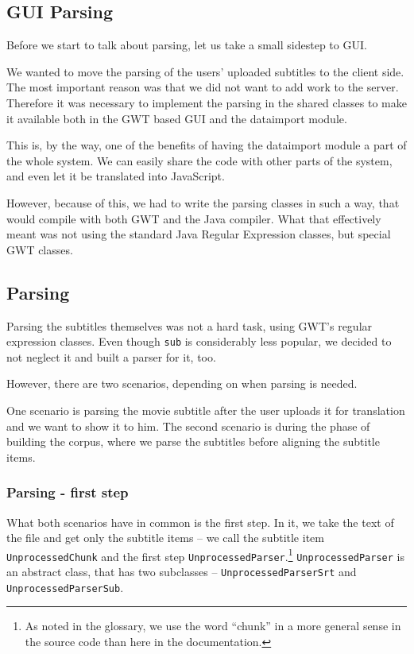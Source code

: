 \subsection{GUI Parsing}
Before we start to talk about parsing, let us take a small sidestep to GUI.

We wanted to move the parsing of the users' uploaded subtitles to the client side. The most important reason was that we did not want to add work to the server. Therefore it was necessary to implement the parsing in the shared classes to make it available both in the GWT based GUI and the dataimport module.

This is, by the way, one of the benefits of having the dataimport module a part of the whole system. We can easily share the code with other parts of the system, and even let it be translated into JavaScript.

However, because of this, we had to write the parsing classes in such a way, that would compile with both GWT and the Java compiler. What that effectively meant was not using the standard Java Regular Expression classes, but special GWT classes.

\subsection{Parsing}
Parsing the subtitles themselves was not a hard task, using GWT's regular expression classes. Even though \texttt{sub} is considerably less popular, we decided to not neglect it and built a parser for it, too.

However, there are two scenarios, depending on when parsing is needed.

One scenario is parsing the movie subtitle after the user uploads it for translation and we want to show it to him. The second scenario is during the phase of building the corpus, where we parse the subtitles before aligning the subtitle items.

\subsubsection*{Parsing - first step}

What both scenarios have in common is the first step. In it, we take the text of the file and get only the subtitle items -- we call the subtitle item \texttt{UnprocessedChunk} and the first step \texttt{UnprocessedParser}.\footnote{As noted in the glossary, we use the word ``chunk'' in a more general sense in the source code than here in the documentation.} \texttt{UnprocessedParser} is an abstract class, that has two subclasses -- \texttt{UnprocessedParserSrt} and \texttt{UnprocessedParserSub}.

